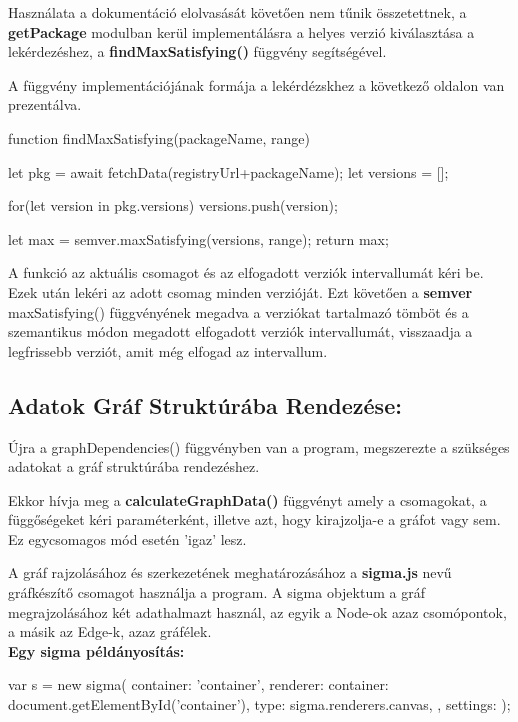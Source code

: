 Használata a dokumentáció elolvasását követően nem tűnik összetettnek, a \textbf{getPackage} modulban kerül implementálásra a helyes verzió kiválasztása a lekérdezéshez, a \textbf{findMaxSatisfying()} függvény segítségével.

A függvény implementációjának formája a lekérdézskhez a következő oldalon van prezentálva.

\pagebreak

\begin{cpp}
function findMaxSatisfying(packageName, range){
	let pkg = await fetchData(registryUrl+packageName);
	let versions = [];
	
	for(let version in pkg.versions){
		versions.push(version);
	}
	
	let max = semver.maxSatisfying(versions, range);
	return max;
}
\end{cpp}

A funkció az aktuális csomagot és az elfogadott verziók intervallumát kéri be. Ezek után lekéri az adott csomag minden verzióját. Ezt követően a \textbf{semver} maxSatisfying() függvényének megadva a verziókat tartalmazó tömböt és a szemantikus módon megadott elfogadott verziók intervallumát, visszaadja a legfrissebb verziót, amit még elfogad az intervallum.\\

\subsection{Adatok Gráf Struktúrába Rendezése:}

Újra a graphDependencies() függvényben van a program, megszerezte a szükséges adatokat a gráf struktúrába rendezéshez.

Ekkor hívja meg a \textbf{calculateGraphData()} függvényt amely a csomagokat, a függőségeket kéri paraméterként, illetve azt, hogy kirajzolja-e a gráfot vagy sem. Ez egycsomagos mód esetén 'igaz' lesz.

A gráf rajzolásához és szerkezetének meghatározásához a \textbf{sigma.js} nevű gráfkészítő csomagot használja a program. A sigma objektum a gráf megrajzolásához két adathalmazt használ, az egyik a Node-ok azaz csomópontok, a másik az Edge-k, azaz gráfélek.\\

\textbf{Egy sigma példányosítás:
}
\begin{cpp}
var s = new sigma({ 
	container: 'container',
	renderer: {
		container: document.getElementById('container'),
		type: sigma.renderers.canvas,
	},
	settings: {
	}
}); 
\end{cpp}

